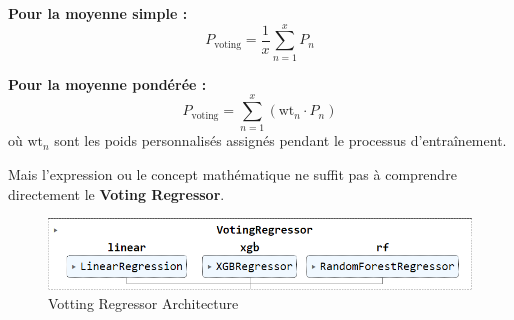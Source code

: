 \textbf{Pour la moyenne simple :} 
\[
P_{\text{voting}}=\frac{1}{x}\sum_{n=1}^x{P_n}       
\]

\textbf{Pour la moyenne pondérée :} 
\[
P_{\text{voting}}=\sum_{n=1}^x (\text{wt}_{n} \cdot P_n)
\]
où \(\text{wt}_n\) sont les poids personnalisés assignés pendant le processus d'entraînement.

Mais l'expression ou le concept mathématique ne suffit pas à comprendre directement le \textbf{Voting Regressor}.


\begin{figure}[h!]
	\centering
	\includegraphics[width=0.8\linewidth]{images/schema_ensemble}
	\caption{Votting Regressor Architecture}
	\label{fig:schemaensemble}
\end{figure}
